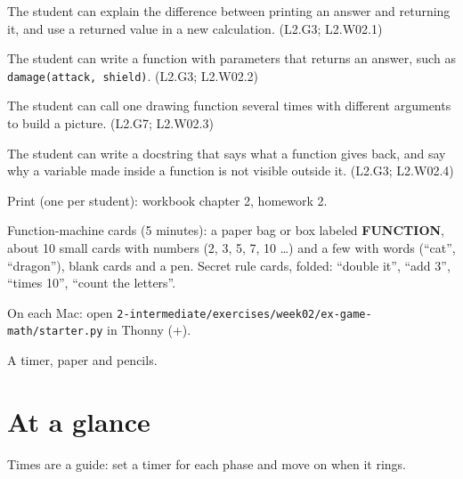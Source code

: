 
\begin{objectives}
  \item The student can explain the difference between printing an answer and returning it, and use a returned value in a new calculation. (L2.G3; L2.W02.1)
  \item The student can write a function with parameters that returns an answer, such as \texttt{damage(attack, shield)}. (L2.G3; L2.W02.2)
  \item The student can call one drawing function several times with different arguments to build a picture. (L2.G7; L2.W02.3)
  \item The student can write a docstring that says what a function gives back, and say why a variable made inside a function is not visible outside it. (L2.G3; L2.W02.4)
\end{objectives}

\begin{materials}
  \item Print (one per student): workbook chapter 2, homework 2.
  \item Function-machine cards (5 minutes): a paper bag or box labeled \textbf{FUNCTION}, about 10 small cards with numbers
        (2, 3, 5, 7, 10 \ldots) and a few with words (\enquote{cat}, \enquote{dragon}), blank cards and a pen.
        Secret rule cards, folded: \enquote{double it}, \enquote{add 3}, \enquote{times 10}, \enquote{count the letters}.
  \item On each Mac: open \texttt{2-intermediate/exercises/week02/ex-game-math/starter.py} in Thonny (+).
  \item A timer, paper and pencils.
\end{materials}

\section{At a glance}
Times are a guide: set a timer for each phase and move on when it rings.
\begin{timeplan}
\end{timeplan}


